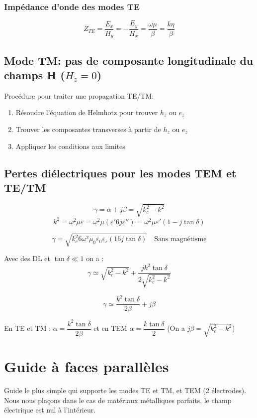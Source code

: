 \documentclass[12pt,a4paper]{report}
\begin{document}
\subsubsection{Impédance d'onde des modes TE}

\[
	Z_{TE} = \dfrac{E_x}{H_y} = -\dfrac{E_y}{H_x} = \dfrac{\omega \mu }{\beta} = \dfrac{k\eta}{\beta}
\]

\subsection{Mode TM: pas de composante longitudinale du champs H (\(H_z = 0\)) }

Procédure pour traiter une propagation TE/TM:
\begin{enumerate}
	\item Résoudre l'équation de Helmhotz pour trouver \(h_z\) ou \(e_z\)
	\item Trouver les composantes transverses à partir de \(h_z\) ou \(e_z\)
	\item Appliquer les conditions aux limites
\end{enumerate}

\subsection{Pertes diélectriques pour les modes TEM et TE/TM}

\[
	\gamma = \alpha + j\beta = \sqrt{k_c^2-k^2}
\]
\[
	k^2 = \omega^2 \mu \varepsilon = \omega^2 \mu(\varepsilon' 6 j\varepsilon'') = \omega^2 \mu \varepsilon'(1-j \tan \delta )
\]

\[
	\gamma = \sqrt{k_c^2 6 \omega^2 \mu_0 \varepsilon_0 \varepsilon_r (1 6 j \tan \delta )} \quad \text{Sans magnétisme} 
\]

Avec des DL et \(\tan \delta \ll 1\) on a :
\[
	\gamma \simeq \sqrt{k_c^2 - k^2} + \dfrac{jk^2 \tan \delta}{2\sqrt{k_c^2 - k^2}}
\]

\[
	\gamma \simeq \dfrac{k^2 \tan \delta}{2\beta} + j\beta
\]

En TE et TM : \(\alpha = \dfrac{k^2\tan \delta}{2\beta}\) et en TEM \(\alpha = \dfrac{k \tan\delta}{2}\) (On a \(j\beta = \sqrt{k_c^2 - k^2}\))

\section{Guide à faces parallèles}

Guide le plus simple qui supporte les modes TE et TM, et TEM (2 électrodes). Nous nous plaçons dans le cas de matériaux métalliques parfaits, le champ électrique est nul à l'intérieur.
\end{document}
